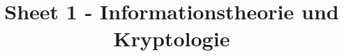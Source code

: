 \documentclass{article}
\begin{document}
	\title{Sheet 1 - Informationstheorie und Kryptologie}
	\date{}
	\author{}

	\maketitle
\end{document}
